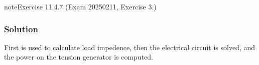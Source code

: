 \documentclass[letterpaper,10pt,english]{jupyterBook}
\begin{document}
\begin{sphinxadmonition}{note}{Exercise 11.4.7 (Exam 2025\sphinxhyphen{}02\sphinxhyphen{}11, Exercise 3.)}



\begin{figure}[htbp]
\centering

\noindent{}
\end{figure}
\subsubsection*{Solution}

\sphinxAtStartPar
First {\hyperref[\detokenize{ch/electrical-engineering-networks-harmonic:classical-electromagnetism-electrical-engineering-newtork-analysis-harmonic-power}]{}} is used to calculate load impedence, then the electrical circuit is solved, and the power on the tension generator is computed.


\end{sphinxadmonition}
\end{document}
